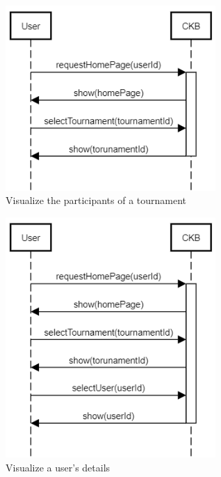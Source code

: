 \documentclass{article}
\begin{document}
\begin{figure}[!ht]
    \centering
    \includegraphics[width=8cm]{LaudiziMarusicMassarelli/RASD/Visualizeparticipants.png}
    \caption{Visualize the participants of a tournament}
    \label{fig:Visualize the participants of a tournament}
\end{figure}

\begin{figure}[!ht]
    \centering
    \includegraphics[width=8cm]{LaudiziMarusicMassarelli/RASD/VisualizeUser.png}
    \caption{Visualize a user's details}
    \label{fig:Visualize user's details}
\end{figure}
\end{document}

